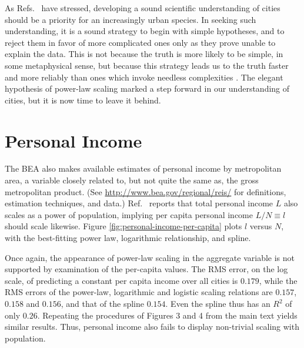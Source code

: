 \documentclass{pnastwo}
\begin{document}
\begin{article}
As Refs.\
\cite{Bettencout-et-al-growth-innovation-scaling,Bettencourt-et-al-urban-scaling-and-its-deviations,Bettencourt-West-unified-theory-of-urban-living}
have stressed, developing a sound scientific understanding of cities should be
a priority for an increasingly urban species.  In seeking such understanding,
it is a sound strategy to begin with simple hypotheses, and to reject them in
favor of more complicated ones only as they prove unable to explain the data.
This is not because the truth is more likely to be simple, in some metaphysical
sense, but because this strategy leads us to the truth faster and more reliably
than ones which invoke needless complexities
\cite{Kelly-simplicity-truth-probability}.  The elegant hypothesis of power-law
scaling marked a step forward in our understanding of cities, but it is now
time to leave it behind.



\appendix{}

\section{Personal Income}
\label{sec:personal-income}

The BEA also makes available estimates of personal income by metropolitan area,
a variable closely related to, but not quite the same as, the gross
metropolitan product.  (See \url{http://www.bea.gov/regional/reis/} for
definitions, estimation techniques, and data.)  Ref.\
\cite{Bettencourt-et-al-urban-scaling-and-its-deviations} reports that total
personal income $L$ also scales as a power of population, implying per capita
personal income $L/N \equiv l$ should scale likewise.  Figure
\ref{fig:personal-income-per-capita} plots $l$ versus $N$, with the
best-fitting power law, logarithmic relationship, and spline.

Once again, the appearance of power-law scaling in the aggregate variable is
not supported by examination of the per-capita values.  The RMS error, on the
log scale, of predicting a constant per capita income over all cities is
$0.179$, while the RMS errors of the power-law, logarithmic and logistic
scaling relations are $0.157$, $0.158$ and $0.156$, and that of the spline
$0.154$.  Even the spline thus has an $R^2$ of only $0.26$.  Repeating the
procedures of Figures 3 and 4 from the main text yields similar results.  Thus,
personal income also fails to display non-trivial scaling with population.





\end{article}
\end{document}
